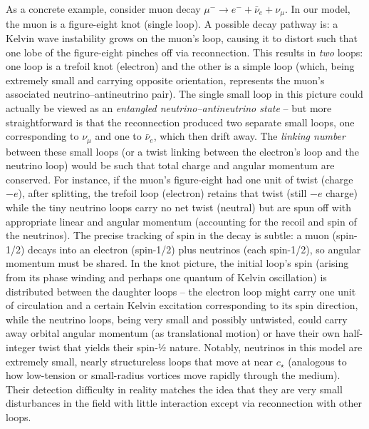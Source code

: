 \documentclass[12pt]{article}
\begin{document}
As a concrete example, consider muon decay $\mu^- \to e^- + \bar\nu_e + \nu_{\mu}$. In our model, the muon is a figure-eight knot (single loop). A possible decay pathway is: a Kelvin wave instability grows on the muon’s loop, causing it to distort such that one lobe of the figure-eight pinches off via reconnection. This results in \emph{two} loops: one loop is a trefoil knot (electron) and the other is a simple loop (which, being extremely small and carrying opposite orientation, represents the muon’s associated neutrino–antineutrino pair). The single small loop in this picture could actually be viewed as an \emph{entangled neutrino–antineutrino state} – but more straightforward is that the reconnection produced two separate small loops, one corresponding to $\nu_{\mu}$ and one to $\bar\nu_e$, which then drift away. The \emph{linking number} between these small loops (or a twist linking between the electron’s loop and the neutrino loop) would be such that total charge and angular momentum are conserved. For instance, if the muon’s figure-eight had one unit of twist (charge $-e$), after splitting, the trefoil loop (electron) retains that twist (still $-e$ charge) while the tiny neutrino loops carry no net twist (neutral) but are spun off with appropriate linear and angular momentum (accounting for the recoil and spin of the neutrinos). The precise tracking of spin in the decay is subtle: a muon (spin-1/2) decays into an electron (spin-1/2) plus neutrinos (each spin-1/2), so angular momentum must be shared. In the knot picture, the initial loop’s spin (arising from its phase winding and perhaps one quantum of Kelvin oscillation) is distributed between the daughter loops – the electron loop might carry one unit of circulation and a certain Kelvin excitation corresponding to its spin direction, while the neutrino loops, being very small and possibly untwisted, could carry away orbital angular momentum (as translational motion) or have their own half-integer twist that yields their spin-½ nature. Notably, neutrinos in this model are extremely small, nearly structureless loops that move at near $c_{\star}$ (analogous to how low-tension or small-radius vortices move rapidly through the medium). Their detection difficulty in reality matches the idea that they are very small disturbances in the field with little interaction except via reconnection with other loops.
\end{document}

